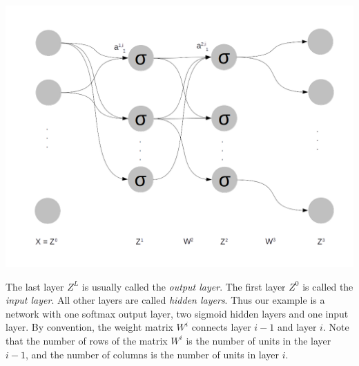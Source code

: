 \documentclass[a4paper, draft]{report}
\numberwithin{section}{chapter}
\numberwithin{equation}{chapter}
\theoremstyle{own}
\theoremstyle{remark}
\begin{document}
\includegraphics[scale=0.42]{LayeredNetworkTopology.png}

The last layer $Z^L$ is usually called the {\em output layer}. The first layer $Z^0$ is called the {\em input layer}. All other layers are called {\em hidden layers}. Thus our example is a network with one softmax output layer, two sigmoid hidden layers and one input layer. By convention, the weight matrix $W^i$ connects layer $i-1$ and layer $i$. Note that the number of rows of the matrix $W^i$ is the number of units in the layer $i-1$, and the number of columns is the number of units in layer $i$. 
\end{document}

